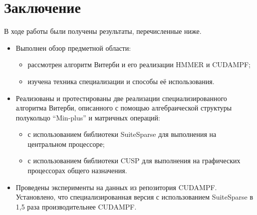 \section{Заключение}
В ходе работы были получены результаты, перечисленные ниже.
\begin{itemize}
	\item Выполнен обзор предметной области:
		\begin{itemize}
			\item рассмотрен алгоритм Витерби и его реализации HMMER и CUDAMPF;
			\item изучена техника специализации и способы её использования.
		\end{itemize}
	\item Реализованы и протестированы две реализации специализированного алгоритма Витерби, описанного с помощью алгебраической структуры полукольцо “Min-plus” и матричных операций:
		\begin{itemize}
			\item с использованием библиотеки SuiteSparse для выполнения на центральном процессоре;
			\item с использованием библиотеки CUSP для выполнения на графических процессорах общего назначения.
		\end{itemize}
	\item Проведены эксперименты на данных из репозитория  CUDAMPF. Установлено, что специализированная версия с использованием SuiteSparse в 1,5 раза производительнее CUDAMPF.
\end{itemize}
